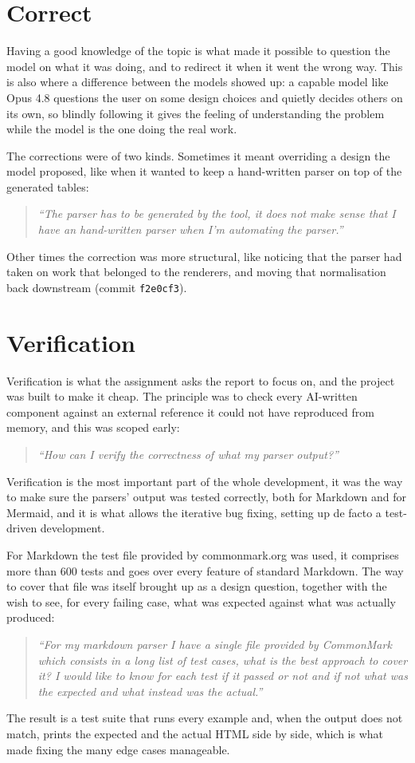 \documentclass[12pt]{report}
\begin{document}
\section{Correct}

Having a good knowledge of the topic is what made it possible to question the model on what it was doing, and to redirect it when it went the wrong way. This is also where a difference between the models showed up: a capable model like Opus 4.8 questions the user on some design choices and quietly decides others on its own, so blindly following it gives the feeling of understanding the problem while the model is the one doing the real work.

The corrections were of two kinds. Sometimes it meant overriding a design the model proposed, like when it wanted to keep a hand-written parser on top of the generated tables:
\begin{quote}\itshape ``The parser has to be generated by the tool, it does not make sense that I have an hand-written parser when I'm automating the parser.''\end{quote}
Other times the correction was more structural, like noticing that the parser had taken on work that belonged to the renderers, and moving that normalisation back downstream (commit \verb|f2e0cf3|).


\section{Verification}

Verification is what the assignment asks the report to focus on, and the project was built to make it cheap. The principle was to check every AI-written component against an external reference it could not have reproduced from memory, and this was scoped early:
\begin{quote}\itshape ``How can I verify the correctness of what my parser output?''\end{quote}

Verification is the most important part of the whole development, it was the way to make sure the parsers' output was tested correctly, both for Markdown and for Mermaid, and it is what allows the iterative bug fixing, setting up de facto a test-driven development.

For Markdown the test file provided by commonmark.org was used, it comprises more than 600 tests and goes over every feature of standard Markdown. The way to cover that file was itself brought up as a design question, together with the wish to see, for every failing case, what was expected against what was actually produced:
\begin{quote}\itshape ``For my markdown parser I have a single file provided by CommonMark which consists in a long list of test cases, what is the best approach to cover it? I would like to know for each test if it passed or not and if not what was the expected and what instead was the actual.''\end{quote}
The result is a test suite that runs every example and, when the output does not match, prints the expected and the actual HTML side by side, which is what made fixing the many edge cases manageable.
\end{document}
